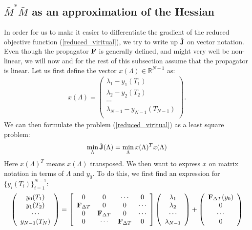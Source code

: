\documentclass[11pt,a4paper]{article}
\begin{document}
\subsection{$\bar{M}^{*}\bar{M}$ as an approximation of the Hessian} 
In order for us to make it easier to differentiate the gradient of the reduced objective function (\ref{reduced_viritual}), we try to write up $\hat{\bold J}$ on vector notation. Even though the propagator $\bold F$ is generally defined, and might very well be non-linear, we will now and for the rest of this subsection assume that the propagator is linear. Let us first define the vector $x(\Lambda)\in\mathbb{R}^{N-1}$ as:
\begin{align}
x(\Lambda)= \left( \begin{array}{c}  
   \lambda_1 - y_1(T_1) \\ 
   \lambda_2 - y_2(T_2) \\
   \cdots  \\
   \lambda_{N-1} -y_{N-1}(T_{N-1})  \\
   \end{array}  \right).
\end{align} 
We can then formulate the problem (\ref{reduced_viritual}) as a least square problem:
\begin{align}
\min_{\Lambda}\hat{\bold J}(\Lambda) = \min_{\Lambda}x(\Lambda)^Tx(\Lambda) \label{vector_J}  
\end{align}
Here $x(\Lambda)^T$ means $x(\Lambda)$ transposed. We then want to express $x$ on matrix notation in terms of $\Lambda$ and $y_0$. To do this, we first find an expression for $\{y_i(T_i)\}_{i=1}^{N-1}$:
\begin{align}
\left( \begin{array}{c}
   y_0(T_1) \\  
   y_1(T_2) \\ 
   \cdots  \\
   y_{N-1}(T_N)  \\
   \end{array}  \right)= 
   \left[ \begin{array}{cccc}  
   0 & 0 & \cdots & 0 \\ 
   \bold{F}_{\Delta T}&0 & 0  & \cdots \\
   0 &  \bold{F}_{\Delta T}&0 & \cdots \\
   0 &\cdots &\bold{F}_{\Delta T}& 0   \\
   \end{array}  \right]
   \left( \begin{array}{c}
   \lambda_1 \\  
   \lambda_2 \\ 
   \cdots  \\
   \lambda_{N-1}  \\
   \end{array}  \right) + 
   \left( \begin{array}{c}
   \bold{F}_{\Delta T}(y_0)\\  
   0\\ 
   \cdots  \\
   0  \\
   \end{array}  \right)
\end{align}
\end{document}
